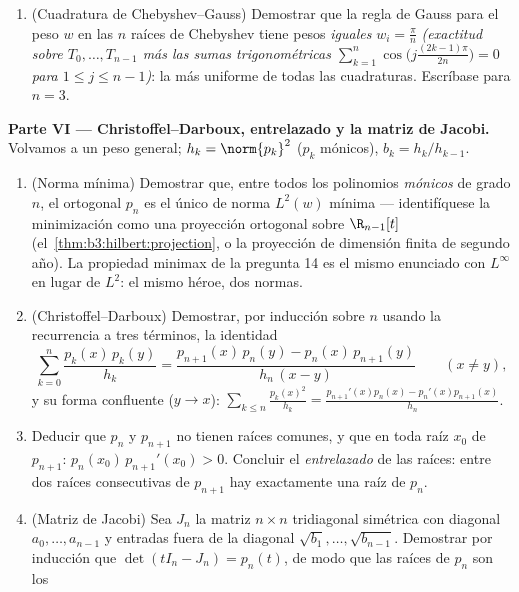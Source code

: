 \begin{problem}
\begin{enumerate}[resume]
        borde (la desigualdad de Markov dice que no más --- solo el
        enunciado). ¿En qué parte del intervalo la cota de la derivada
        es solo $O(n)$? \item (Cuadratura de Chebyshev--Gauss) Demostrar
        que la regla de Gauss para el peso $w$ en las $n$ raíces de
        Chebyshev tiene pesos \emph{iguales} $w_i = \frac\pi n$
        \emph{(exactitud sobre $T_0, \dots, T_{n-1}$ más las sumas
        trigonométricas
        $\sum_{k=1}^n\cos\bigl(j\tfrac{(2k-1)\pi}{2n}\bigr) =
        0$ para $1 \leq j \leq n - 1$)}: la más uniforme de todas las
        cuadraturas. Escríbase para $n = 3$.
\end{enumerate}

\medskip
\noindent\textbf{Parte VI --- Christoffel--Darboux, entrelazado y la
matriz de Jacobi.} Volvamos a un peso general; $h_k = \norm{p_k}^2$
($p_k$ mónicos), $b_k = h_k/h_{k-1}$.
\begin{enumerate}[resume]
  \item (Norma mínima) Demostrar que, entre todos los polinomios
  \emph{mónicos} de grado $n$, el ortogonal $p_n$ es el único de norma
  $L^2(w)$ mínima --- identifíquese la minimización como una proyección
  ortogonal sobre $\R_{n-1}[t]$ (el~\cref{thm:b3:hilbert:projection}, o
  la proyección de dimensión finita de segundo año). La propiedad
  minimax de la pregunta 14 es el mismo enunciado con $L^\infty$ en
  lugar de $L^2$: el mismo héroe, dos normas. \item
  (Christoffel--Darboux) Demostrar, por inducción sobre $n$ usando la
  recurrencia a tres términos, la identidad
        \[
        \sum_{k=0}^{n}\frac{p_k(x)\,p_k(y)}{h_k}
        = \frac{p_{n+1}(x)\,p_n(y) -
        p_n(x)\,p_{n+1}(y)}{h_n\,(x - y)}
        \qquad (x \neq y),
        \]
        y su forma confluente ($y \to x$):
        $\sum_{k\leq n}\frac{p_k(x)^2}{h_k} =
        \frac{p_{n+1}'(x)p_n(x) - p_n'(x)p_{n+1}(x)}{h_n}$.
  \item Deducir que $p_n$ y $p_{n+1}$ no tienen raíces comunes, y que en
  toda raíz $x_0$ de $p_{n+1}$: $p_n(x_0)\,p_{n+1}'(x_0) > 0$. Concluir
  el \emph{entrelazado} de las raíces: entre dos raíces consecutivas de
  $p_{n+1}$ hay exactamente una raíz de $p_n$. \item (Matriz de Jacobi)
  Sea $J_n$ la matriz $n\times n$ tridiagonal simétrica con diagonal
  $a_0,
        \dots, a_{n-1}$ y entradas fuera de la diagonal $\sqrt{b_1},
        \dots, \sqrt{b_{n-1}}$. Demostrar por inducción que
  $\det(tI_n - J_n) = p_n(t)$, de modo que las raíces de $p_n$ son los

\end{enumerate}
\end{problem}
